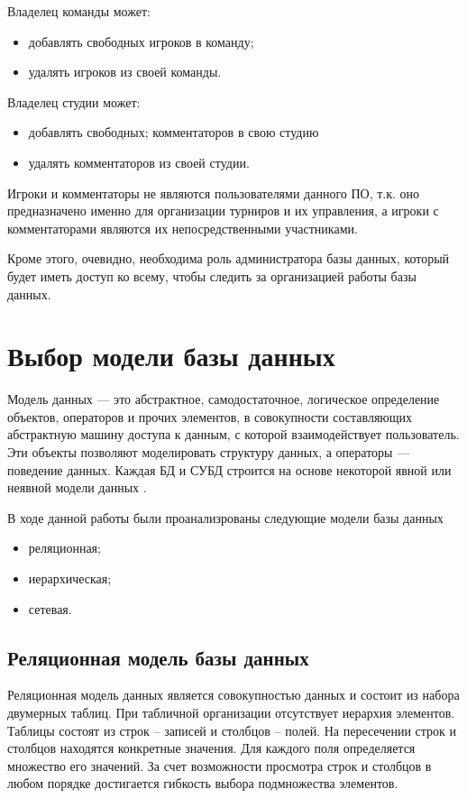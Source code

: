 Владелец команды может:
\begin{itemize}
	\item добавлять свободных игроков в команду;
	\item удалять игроков из своей команды.
\end{itemize}

Владелец студии может:
\begin{itemize}
	\item добавлять свободных; комментаторов в свою студию
	\item удалять комментаторов из своей студии.
\end{itemize}

Игроки и комментаторы не являются пользователями данного ПО, т.к. оно предназначено именно для организации турниров и их управления, а игроки с комментаторами являются их непосредственными участниками.

Кроме этого, очевидно, необходима роль администратора базы данных, который будет иметь доступ ко всему, чтобы следить за организацией работы базы данных.

\section{Выбор модели базы данных}
Модель данных — это абстрактное, самодостаточное, логическое определение объектов, операторов и прочих элементов, в совокупности составляющих абстрактную машину доступа к данным, с которой взаимодействует пользователь. Эти объекты позволяют моделировать структуру данных, а операторы — поведение данных. Каждая БД и СУБД строится на основе некоторой явной или неявной модели данных \cite{Deit book}.

В ходе данной работы были проанализрованы следующие модели базы данных
\begin{itemize}
	\item реляционная;
	\item иерархическая;
	\item сетевая.
\end{itemize}

\subsection{Реляционная модель базы данных}
Реляционная модель данных является совокупностью данных и состоит из набора двумерных таблиц. При табличной организации отсутствует иерархия элементов. Таблицы состоят из строк – записей и столбцов – полей. На пересечении строк и столбцов находятся конкретные значения. Для каждого поля определяется множество его значений. За счет возможности просмотра строк и столбцов в любом порядке достигается гибкость выбора подмножества элементов.

